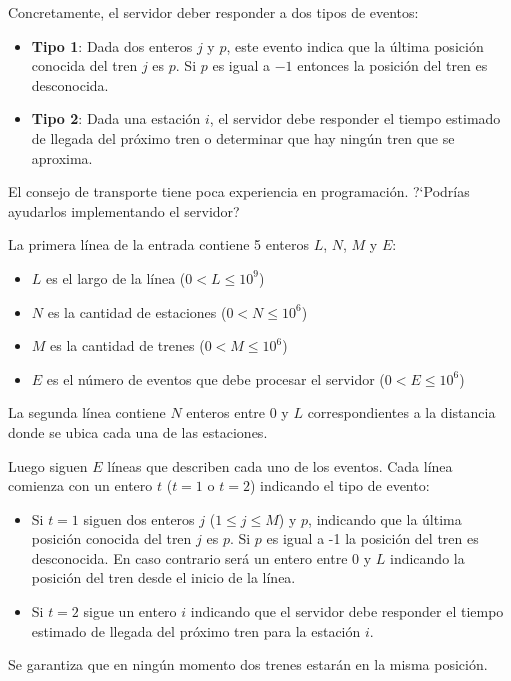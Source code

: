 \documentclass{oci}
\begin{document}
\begin{problemDescription}
  Concretamente, el servidor deber responder a dos tipos
  de eventos:
  \begin{itemize}
    \item \textbf{Tipo 1}: Dada dos enteros $j$ y $p$, este evento
    indica que la última posición conocida del tren $j$ es $p$.
    Si $p$ es igual a $-1$ entonces la posición del tren es desconocida.
    \item \textbf{Tipo 2}: Dada una estación $i$, el servidor debe
    responder el tiempo estimado de llegada del próximo tren o determinar
    que hay ningún tren que se aproxima.
  \end{itemize}
  El consejo de transporte tiene poca experiencia en programación.
  ?`Podrías ayudarlos implementando el servidor?
\end{problemDescription}

\begin{inputDescription}
  La primera línea de la entrada contiene 5 enteros $L$, $N$, $M$ y $E$:
  \begin{itemize}
    \item $L$ es el largo de la línea ($0 < L \leq 10^9$)
    \item $N$ es la cantidad de estaciones ($0 < N \leq 10^6$)
    \item $M$ es la cantidad de trenes ($0 < M \leq 10^6$)
    \item $E$ es el número de eventos que debe procesar el servidor ($0 < E \leq 10^6$)
  \end{itemize}
  La segunda línea contiene $N$ enteros entre 0 y $L$ correspondientes a la distancia
  donde se ubica cada una de las estaciones.

  Luego siguen $E$ líneas que describen cada uno de los eventos.
  Cada línea comienza con un entero $t$ ($t=1$ o $t=2$) indicando el tipo de evento:
  \begin{itemize}
  \item Si $t=1$ siguen dos enteros $j$ ($1\leq j \leq M$) y $p$, indicando
  que la última posición conocida del tren $j$ es $p$.
  Si $p$ es igual a -1 la posición del tren es desconocida.
  En caso contrario será un entero entre 0 y $L$ indicando la posición del tren
  desde el inicio de la línea.
  \item Si $t=2$ sigue un entero $i$ indicando que el servidor debe responder el tiempo
  estimado de llegada del próximo tren para la estación $i$.
  \end{itemize}

  Se garantiza que en ningún momento dos trenes estarán en la misma posición.
\end{inputDescription}
\end{document}
